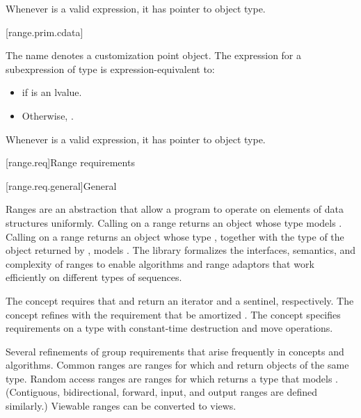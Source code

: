 \pnum
\begin{note}
Whenever  is a valid expression, it
has pointer to object type.
\end{note}

[range.prim.cdata]{}
%

\pnum
The name  denotes a customization point
object. The expression
 for a subexpression  of type 
is expression-equivalent to:
\begin{itemize}
\item {} if  is an lvalue.

\item Otherwise, .
\end{itemize}

\pnum
\begin{note}
Whenever  is a valid expression, it
has pointer to object type.
\end{note}

[range.req]{Range requirements}

[range.req.general]{General}

\pnum
Ranges are an abstraction that allow a \Cpp{} program
to operate on elements of data structures uniformly.
Calling  on a range returns an object
whose type models .
Calling  on a range returns an object whose type ,
together with the type  of the object returned by ,
models .
The library formalizes the interfaces, semantics, and complexity of ranges
to enable algorithms and range adaptors that work efficiently
on different types of sequences.

\pnum
The  concept requires that
 and 
return an iterator and a sentinel, respectively.
The  concept refines  with
the requirement that  be amortized .
The  concept specifies requirements on a  type
with constant-time destruction and move operations.

\pnum
Several refinements of  group requirements
that arise frequently in concepts and algorithms.
Common ranges are ranges for which
 and 
return objects of the same type.
Random access ranges are ranges for which 
returns a type that models
.
(Contiguous, bidirectional, forward, input, and output ranges
are defined similarly.)
Viewable ranges can be converted to views.


